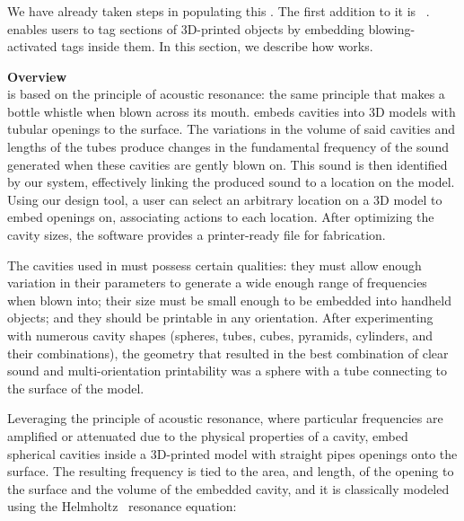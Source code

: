     \subsubsection{\bh}
      We have already taken steps in populating this \itoolkit. The
      first addition to it is \bh~\cite{Tejada:2018fj}. \bh enables
      users to tag sections of 3D-printed objects by embedding blowing-activated
      tags inside them. In this section, we describe how \bh works.

      \textbf{Overview}\\        
        \bh is based on the principle of acoustic resonance: the same
        principle that makes a bottle whistle when blown across its mouth.
        \bh embeds cavities into 3D models with tubular openings to the
        surface. The variations in the volume of said cavities and lengths of
        the tubes produce changes in the fundamental frequency of the sound
        generated when these cavities are gently blown on. This sound is then
        identified by our system, effectively linking the produced sound to a
        location on the model. Using our design tool, a user can select an
        arbitrary location on a 3D model to embed openings on, associating
        actions to each location. After optimizing the cavity sizes, the
        software provides a printer-ready file for fabrication.
        
        The cavities used in \bh must possess certain qualities: they must
        allow enough variation in their parameters to generate a wide enough
        range of frequencies when blown into; their size must be small enough
        to be embedded into handheld objects; and they should be printable in
        any orientation. After experimenting with numerous cavity shapes
        (spheres, tubes, cubes, pyramids, cylinders, and their 
        combinations), the geometry that resulted in the best combination of
        clear sound and multi-orientation printability was a sphere with a tube
        connecting to the surface of the model.
        
        Leveraging the principle of acoustic resonance, where particular
        frequencies are amplified or attenuated due to the physical properties
        of a cavity, \bh embed spherical cavities inside a 3D-printed model with
        straight pipes openings onto the surface. The resulting frequency is
        tied to the area, and length, of the opening to the surface and the
        volume of the embedded cavity, and it is classically modeled using the 
        Helmholtz~\cite{Helmholtz:1885vp} resonance equation:
        

